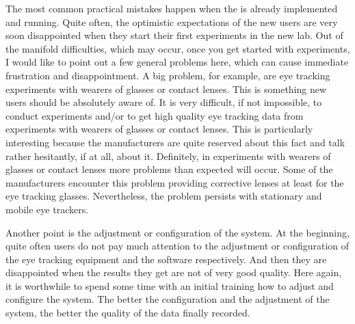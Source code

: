 \documentclass[output=paper]{langsci/langscibook}
\begin{document}
The most common practical mistakes happen when the  is already implemented and running. Quite often, the optimistic expectations of the new users are very soon disappointed when they start their first experiments in the new lab. Out of the manifold difficulties, which may occur, once you get started with  experiments, I would like to point out a few general problems here, which can cause immediate frustration and disappointment. A big problem, for example, are eye tracking experiments with wearers of glasses or contact lenses. This is something new users should be absolutely aware of. It is very difficult, if not impossible, to conduct experiments and/or to get high quality eye tracking data from experiments with wearers of glasses or contact lenses. This is particularly interesting because the manufacturers are quite reserved about this fact and talk rather hesitantly, if at all, about it. Definitely, in experiments with wearers of glasses or contact lenses more problems than expected will occur. Some of the manufacturers encounter this problem providing corrective lenses at least for the eye tracking glasses. Nevertheless, the problem persists with stationary and mobile eye trackers.



Another point is the adjustment or configuration of the system. At the beginning, quite often users do not pay much attention to the adjustment or configuration of the eye tracking equipment and the software respectively. And then they are disappointed when the results they get are not of very good quality. Here again, it is worthwhile to spend some time with an initial training how to adjust and configure the system. The better the configuration and the adjustment of the system, the better the quality of the data finally recorded.
\end{document}
